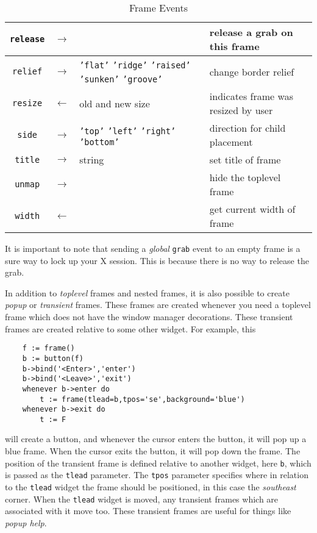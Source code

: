 \begin{table}[tbh]
{\begin{center}
\begin{tabular}{|c|c|p{1.6in}|p{1.9in}|}
{\tt release}   &$\rightarrow$& & release a grab on this frame \\ \hline
{\tt relief}    &$\rightarrow$& {\tt 'flat'} {\tt 'ridge'} {\tt 'raised'} {\tt 'sunken'} {\tt 'groove'} & change border relief \\ \hline
{\tt resize}    &$\leftarrow$& old and new size & indicates frame was resized by user \\ \hline
{\tt side}      &$\rightarrow$& {\tt 'top'} {\tt 'left'} {\tt 'right'} {\tt 'bottom'} & direction for child placement \\ \hline
{\tt title}     &$\rightarrow$& string & set title of frame \\ \hline
{\tt unmap}     &$\rightarrow$& & hide the toplevel frame \\ \hline
{\tt width}     &$\leftarrow$& & get current width of frame \\ \hline
\end{tabular}
\end{center}
}
\caption{ Frame Events }
\label{tkframe-events}
\end{table}

It is important to note that sending a {\em global} {\tt grab} event to an
empty frame is a sure way to lock up your X session. This is because there
is no way to release the grab.

In addition to {\em toplevel} frames and nested frames, it is also possible to
create {\em popup} or {\em transient} frames. These frames are created whenever
you need a toplevel frame which does not have the window manager decorations.
These transient frames are created relative to some other widget. For example, this
\begin{verbatim}
    f := frame()
    b := button(f)
    b->bind('<Enter>','enter')
    b->bind('<Leave>','exit')
    whenever b->enter do
        t := frame(tlead=b,tpos='se',background='blue')
    whenever b->exit do
        t := F
\end{verbatim}
will create a button, and whenever the cursor enters the button, it will pop up
a blue frame. When the cursor exits the button, it will pop down the frame. The
position of the transient frame is defined relative to another widget, here
{\tt b}, which is passed as the {\tt tlead} parameter. The {\tt tpos}
parameter specifies where in relation to the {\tt tlead} widget the frame
should be positioned, in this case the {\em southeast} corner. When the
{\tt tlead} widget is moved, any transient frames which are associated
with it move too. These transient frames are useful for things like {\em popup help}.
\FloatBarrier

